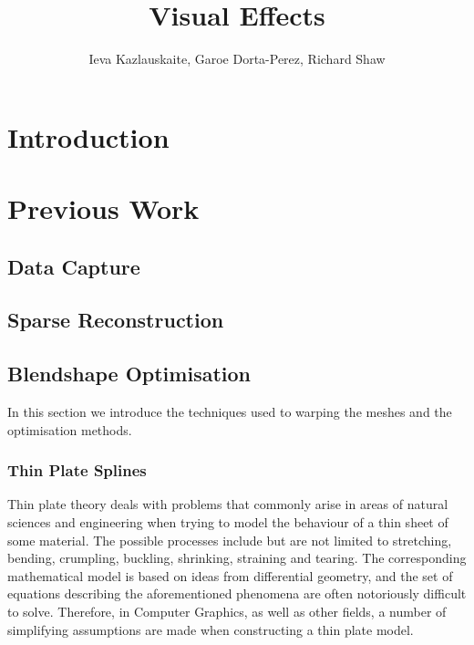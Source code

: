 \documentclass[11pt]{report}
\title{Visual Effects} \author{Ieva Kazlauskaite, Garoe Dorta-Perez, Richard Shaw}
\begin{document}
\maketitle

\chapter{Introduction}
\label{ch:intro}
\begin{center}
\end{center}


\chapter{Previous Work}
\label{sec:previous}

\section{Data Capture}

\section{Sparse Reconstruction}


\section{Blendshape Optimisation}
In this section we introduce the techniques used to warping the meshes and the optimisation methods.

\subsection{Thin Plate Splines}
Thin plate theory deals with problems that commonly arise in areas of natural sciences and engineering when trying to model the behaviour of a thin sheet of some material. The possible processes include but are not limited to stretching, bending, crumpling, buckling, shrinking, straining and tearing. The corresponding mathematical model is based on ideas from differential geometry, and the set of equations describing the aforementioned phenomena are often notoriously difficult to solve. Therefore, in Computer Graphics, as well as other fields, a number of simplifying assumptions are made when constructing a thin plate model. \\
\end{document}
